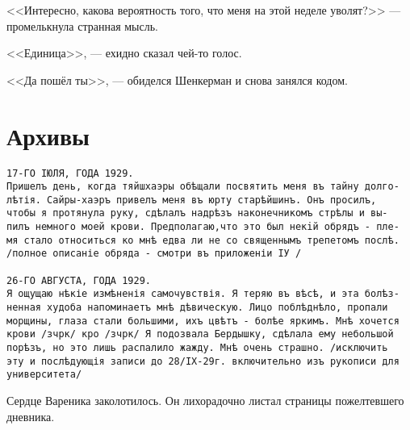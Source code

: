 \documentclass[a4paper,10pt,fleqn]{book}\usepackage{polyglossia}\setdefaultlanguage{english}\setotherlanguage{russian}\defaultfontfeatures{Ligatures=TeX,Mapping=tex-text} \usepackage{xcolor}\definecolor{lightgray}{HTML}{bbbbbb}\color{lightgray}\newcommand{\ml}[3]{\textcolor{black}{#3}}
\begin{document}
<<Интересно, какова вероятность того, что меня на этой неделе уволят?>> --- промелькнула странная мысль.

<<Единица>>, --- ехидно сказал чей-то голос.

<<Да пошёл ты>>, --- обиделся Шенкерман и снова занялся кодом.

\section{Архивы}


\begin{verbatim}
17-ГО IЮЛЯ, ГОДА 1929.
Пришелъ день, когда тяйшхаэры обѣщали посвятить меня въ тайну долго-
лѣтія. Сайры-хаэръ привелъ меня въ юрту старѣйшинъ. Онъ просилъ,
чтобы я протянула руку, сдѣлалъ надрѣзъ наконечникомъ стрѣлы и вы-
пилъ немного моей крови. Предполагаю,что это был некiй обрядъ - пле-
мя стало относиться ко мнѣ едва ли не со священнымъ трепетомъ послѣ.
/полное описаніе обряда - смотри въ приложеніи IУ /

26-ГО АВГУСТА, ГОДА 1929.
Я ощущаю нѣкіе измѣненія самочувствія. Я теряю въ вѣсѣ, и эта болѣз-
ненная худоба напоминаетъ мнѣ дѣвическую. Лицо поблѣднѣло, пропали
морщины, глаза стали большими, ихъ цвѣтъ - болѣе яркимъ. Мнѣ хочется
крови /зчрк/ кро /зчрк/ Я подозвала Бердышку, сдѣлала ему небольшой
порѣзъ, но это лишь распалило жажду. Мнѣ очень страшно. /исключить
эту и послѣдующія записи до 28/IX-29г. включительно изъ рукописи для
университета/
\end{verbatim}

Сердце Вареника заколотилось.
Он лихорадочно листал страницы пожелтевшего дневника.
\end{document}

